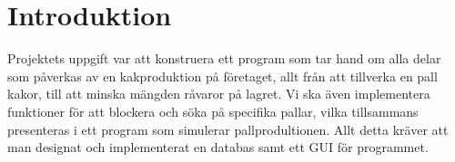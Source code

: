 \section{Introduktion}

Projektets uppgift var att konstruera ett program som tar hand om alla delar som påverkas av en kakproduktion på företaget, allt från att tillverka en pall kakor, till att minska mängden råvaror på lagret. Vi ska även implementera funktioner för att blockera och söka på specifika pallar, vilka tillsammans presenteras i ett program som simulerar pallprodultionen. Allt detta kräver att man designat och implementerat en databas samt ett GUI för programmet.
